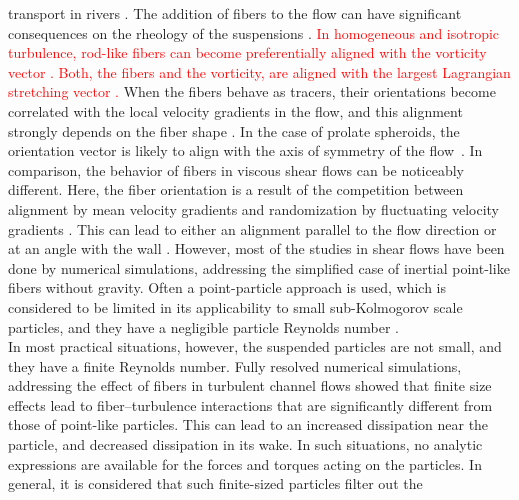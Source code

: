 \documentclass[aps, pre, onecolumn, superscriptaddress,longbibliography]{revtex4-1}
\newcommand{\makered}[1]{\textcolor{red}{#1}}
\begin{document}
transport in rivers \citep{Vercruysse2017,Lopez2017}. The addition of fibers to the flow
can have significant consequences on the rheology of the suspensions
\citep{Butler2018, Daghooghi2015}.
\makered{
In homogeneous and isotropic turbulence, rod-like fibers
can become preferentially aligned with the vorticity vector
\citep{Wilkinson2009, Parsa2011, Pumir2011, Parsa2012, Voth2017}.
Both, the fibers and the vorticity, are aligned with the largest Lagrangian stretching vector \citep{Ni2014}.
}
When the
fibers behave as tracers, their orientations become correlated with the local
velocity gradients in the flow, and this alignment strongly depends on the
fiber shape \citep{Parsa2012}. In the case of prolate spheroids, the
orientation vector is likely to align with the axis of symmetry of the
flow~\citep{Vincenzi2013}.  In comparison, the behavior of fibers in viscous
shear flows can be noticeably different. Here, the fiber orientation is a
result of the competition between alignment by mean velocity gradients and
randomization by fluctuating velocity gradients \cite{Voth2017}.  This can
lead to either an alignment parallel to the flow direction \citep{Jeffery1922,
Butler1999} or at an angle with the wall \cite{zhang2001, mortensen2008,
Marchioli2010, Marchioli2013, Challabotla2015c, Zhao2015b, Zhao2015}.
However, most of the studies in shear flows have been done by numerical
simulations, addressing the simplified case of inertial point-like fibers
without gravity.  Often a point-particle approach is used, which is considered
to be limited in its applicability to small sub-Kolmogorov scale
\cite{Kolmogorov1941, Kolmogorov1941b} particles, and they have a negligible
particle Reynolds number \cite{Maxey1983}.\\
\indent In most practical situations, however, the suspended particles are not small,
and they have a finite Reynolds number.  Fully resolved numerical simulations,
addressing the effect of fibers in turbulent channel flows showed
that finite size effects lead to fiber--turbulence
interactions that are significantly different from those of point-like
particles\cite{DoQuang2014}. This can lead to an increased dissipation near the particle, and
decreased dissipation in its wake.  In such situations, no analytic
expressions are available for the forces and torques acting on the particles.
In general, it is considered that such finite-sized particles  filter out the
\end{document}
